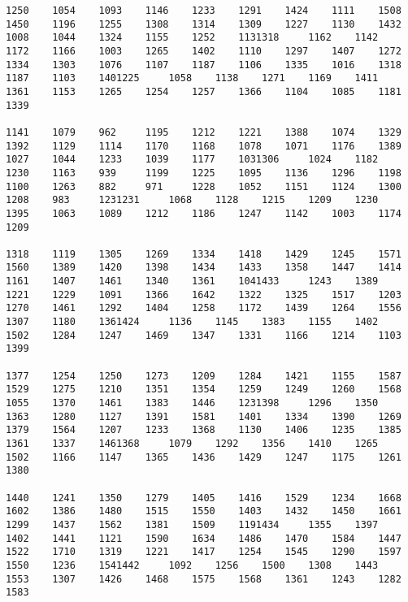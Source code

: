 \begin{verbatim}
1250    1054    1093    1146    1233    1291    1424    1111    1508    1450    1196    1255    1308    1314    1309    1227    1130    1432    1008    1044    1324    1155    1252    1131318     1162    1142    1172    1166    1003    1265    1402    1110    1297    1407    1272    1334    1303    1076    1107    1187    1106    1335    1016    1318    1187    1103    1401225     1058    1138    1271    1169    1411    1361    1153    1265    1254    1257    1366    1104    1085    1181    1339

1141    1079    962     1195    1212    1221    1388    1074    1329    1392    1129    1114    1170    1168    1078    1071    1176    1389    1027    1044    1233    1039    1177    1031306     1024    1182    1230    1163    939     1199    1225    1095    1136    1296    1198    1100    1263    882     971     1228    1052    1151    1124    1300    1208    983     1231231     1068    1128    1215    1209    1230    1395    1063    1089    1212    1186    1247    1142    1003    1174    1209

1318    1119    1305    1269    1334    1418    1429    1245    1571    1560    1389    1420    1398    1434    1433    1358    1447    1414    1161    1407    1461    1340    1361    1041433     1243    1389    1221    1229    1091    1366    1642    1322    1325    1517    1203    1270    1461    1292    1404    1258    1172    1439    1264    1556    1307    1180    1361424     1136    1145    1383    1155    1402    1502    1284    1247    1469    1347    1331    1166    1214    1103    1399

1377    1254    1250    1273    1209    1284    1421    1155    1587    1529    1275    1210    1351    1354    1259    1249    1260    1568    1055    1370    1461    1383    1446    1231398     1296    1350    1363    1280    1127    1391    1581    1401    1334    1390    1269    1379    1564    1207    1233    1368    1130    1406    1235    1385    1361    1337    1461368     1079    1292    1356    1410    1265    1502    1166    1147    1365    1436    1429    1247    1175    1261    1380

1440    1241    1350    1279    1405    1416    1529    1234    1668    1602    1386    1480    1515    1550    1403    1432    1450    1661    1299    1437    1562    1381    1509    1191434     1355    1397    1402    1441    1121    1590    1634    1486    1470    1584    1447    1522    1710    1319    1221    1417    1254    1545    1290    1597    1550    1236    1541442     1092    1256    1500    1308    1443    1553    1307    1426    1468    1575    1568    1361    1243    1282    1583


\end{verbatim}
